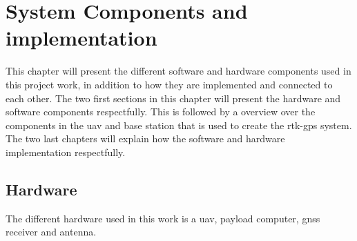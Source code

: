 
\chapter{System Components and implementation}
This chapter will present the different software and hardware components used in this project work, in addition to how they are implemented and connected to each other. The two first sections in this chapter will present the hardware and software components respectfully. This is followed by a overview over the components in the \gls{uav} and base station that is used to create the \gls{rtk-gps} system. The two last chapters will explain how the software and hardware implementation respectfully.
\section{Hardware}
The different hardware used in this work is a \gls{uav}, payload computer, \gls{gnss} receiver and antenna.
